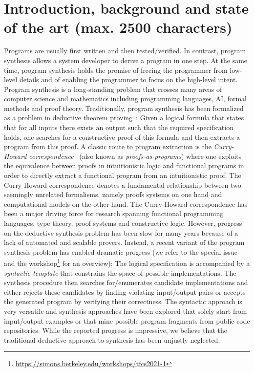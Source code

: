 \documentclass[a4paper,12pt]{article}
\begin{document}
\section{Introduction, background and state of the art (max. 2500 characters)}
Programs are usually first written and then tested/verified.
In contrast, program synthesis allows a system developer to derive a program in one step.
At the same time, program synthesis holds the promise of freeing the programmer from low-level details and of enabling the programmer to focus on the high-level intent.
Program synthesis is a long-standing problem that crosses many areas of computer science and mathematics including programming languages, AI, formal methods and proof theory.
Traditionally, program synthesis has been formalized as a problem in deductive theorem proving~\cite{conf/ijcai/MannaW79}:
Given a logical formula that states that for all inputs there exists an output such that the required specification holds, one searches for a constructive proof of this formula and then extracts a program from this proof.
A classic route to program extraction is the \emph{Curry-Howard correspondence}~\cite{girard1989proofs} (also known as \emph{proofs-as-programs}) where one exploits the equivalence between proofs in intuitionistic logic and functional programs in order to directly extract a functional program from an intuitionistic proof.
The Curry-Howard correspondence denotes a fundamental relationship between two seemingly unrelated formalisms, namely proofs systems on one hand and computational models on the other hand.
The Curry-Howard correspondence has been a major driving force for research spanning functional programming languages, type theory, proof systems and constructive logic.
However, progress on the deductive synthesis problem has been slow for many years because of a lack of automated and scalable provers.
Instead, a recent variant of the program synthesis problem has enabled dramatic progress (we refer to the special issue~\cite{fisman2022special} and the workshop\footnote{\url{https://simons.berkeley.edu/workshops/tfcs2021-1}} for an overview):
The logical specification is accompanied by a \emph{syntactic template} that constrains the space of possible implementations.
The synthesis procedure then searches for/enumerates candidate implementations and either rejects these candidates by finding violating input/output pairs or accepts the generated program by verifying their correctness.
The syntactic approach is very versatile and synthesis approaches have been explored that solely start from input/output examples or that mine possible program fragments from public code repositories.
While the reported progress is impressive, we believe that the traditional deductive approach to synthesis has been unjustly neglected.
\end{document}
